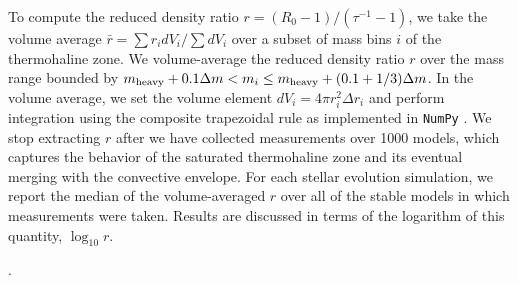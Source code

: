 To compute the reduced density ratio $r = (R_0 - 1)/(\tau^{-1} - 1)$, we take the volume average $\bar{r} = \sum r_i dV_i / \sum dV_i$ over a subset of mass bins $i$ of the thermohaline zone. We volume-average the reduced density ratio $r$ over the mass range bounded by $m_{\rm{heavy}} + 0.1\Delta m  < m_i \leq m_{\rm heavy} + (0.1 + 1/3)\Delta m$.
In the volume average, we set the volume element $dV_i = 4\pi r_i^2 \Delta r_i$ and perform integration using the composite trapezoidal rule as implemented in \texttt{NumPy} \citep{numpy}.
We stop extracting $r$ after we have collected measurements over 1000 models, which captures the behavior of the saturated thermohaline zone and its eventual merging with the convective envelope. For each stellar evolution simulation, we report the median of the volume-averaged $r$ over all of the stable models in which measurements were taken. Results are discussed in terms of the logarithm of this quantity, $\log_{10} r$.

.